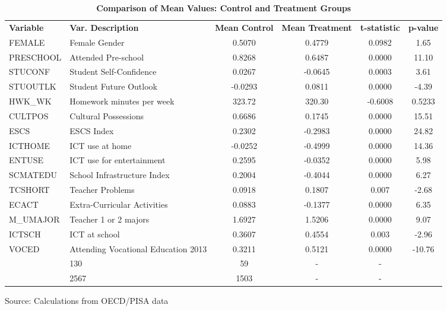 \documentclass[alpha-refs,fleqn]{wiley-article_p2}
\begin{document}
\begin{group}
\smaller
\begin{table}[h]
\caption{\textbf{Comparison of Mean Values: Control and Treatment Groups}}\label{table:2}
\begin{threeparttable}
\setlength{\tabcolsep}{5pt}
\renewcommand{\arraystretch}{1.25}
\begin{tabular}{p{1.7cm}p{4.8cm}cccc}
\rowcolor{grey!30} 
 \textbf{Variable} & \textbf{Var. Description} &  \textbf{Mean Control} & \textbf{Mean Treatment} & \textbf{t-statistic} & \textbf{p-value}    \\
\rowcolor{white} 
FEMALE & Female Gender  & 0.5070 & 0.4779 & 0.0982  & 1.65 \\
\rowcolor{grey!10} 
PRESCHOOL & Attended Pre-school & 0.8268 & 0.6487 & 0.0000 & 11.10 \\
\rowcolor{white} 
STUCONF & Student Self-Confidence & 0.0267 & -0.0645 & 0.0003  & 3.61 \\
\rowcolor{grey!10} 
STUOUTLK  & Student Future Outlook & -0.0293 & 0.0811 & 0.0000 & -4.39 \\
\rowcolor{white} 
HWK\_WK & Homework minutes per week  & 323.72 & 320.30 & -0.6008  & 0.5233 \\
\rowcolor{grey!10} 
CULTPOS   & Cultural Possessions & 0.6686 & 0.1745 & 0.0000 & 15.51 \\
\rowcolor{white} 
ESCS   & ESCS Index & 0.2302 & -0.2983 & 0.0000  & 24.82 \\
\rowcolor{grey!10} 
ICTHOME   & ICT use at home & -0.0252 & -0.4999 & 0.0000 & 14.36 \\
\rowcolor{white} 
ENTUSE & ICT use for entertainment & 0.2595 & -0.0352 & 0.0000  & 5.98 \\
\rowcolor{grey!10} 
SCMATEDU  & School Infrastructure Index & 0.2004 & -0.4044 & 0.0000 & 6.27 \\
\rowcolor{white} 
TCSHORT & Teacher Problems  & 0.0918 & 0.1807 & 0.007  & -2.68 \\
\rowcolor{grey!10} 
ECACT     & Extra-Curricular Activities & 0.0883 & -0.1377 & 0.0000 & 6.35 \\
\rowcolor{white} 
M\_UMAJOR & Teacher 1 or 2 majors & 1.6927 & 1.5206 & 0.0000  & 9.07 \\
\rowcolor{grey!10} 
ICTSCH &  ICT at school & 0.3607 & 0.4554 & 0.003 & -2.96 \\
\rowcolor{white} 
VOCED &  Attending Vocational Education 2013 & 0.3211 & 0.5121 & 0.0000 & -10.76 \\
\rowcolor{grey!10} 
\multicolumn{2}{l}{Number of Schools}\ & 130 & 59 & - & - \\
\rowcolor{grey!10} 
\multicolumn{2}{l}{Number of Students}\ & 2567 & 1503 & - & - \\
\hline  %
\end{tabular}
\begin{tablenotes}
\item Source: Calculations from OECD/PISA data
\end{tablenotes}
\end{threeparttable}
\end{table}
\end{group} 
\end{document}
